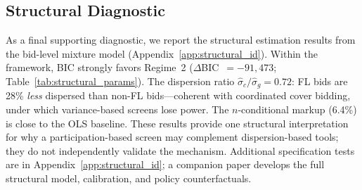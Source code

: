\subsection{Structural Diagnostic}
\label{sec:results_structural}

As a final supporting diagnostic, we report the structural
estimation results from the bid-level mixture model
(Appendix~\ref{app:structural_id}). Within the framework, BIC
strongly favors Regime~2 ($\Delta$BIC~$= -91{,}473$;
Table~\ref{tab:structural_params}). The dispersion ratio
$\hat{\sigma}_c / \hat{\sigma}_g = 0.72$: FL bids are 28\%
\emph{less} dispersed than non-FL bids---coherent with coordinated
cover bidding, under which variance-based screens lose power.
The $n$-conditional markup (6.4\%) is close to the OLS baseline.
These results provide one structural interpretation for why a
participation-based screen may complement dispersion-based tools;
they do not independently validate the mechanism. Additional
specification tests are in Appendix~\ref{app:structural_id};
a companion paper \citep{genicolomartins2026structural} develops
the full structural model, calibration, and policy counterfactuals.
